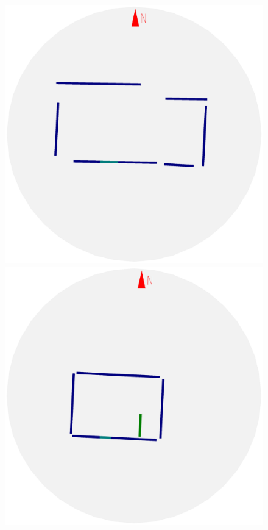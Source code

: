 \begin{figure}[t]
\begin{center}
\begin{minipage}[b]{0.72\textwidth}
  \includegraphics[width=\figwidth]{f2_8_2D_walls_rotate}\\ %
  \includegraphics[width=\figwidth]{f2_3_2D_walls_rotate} %

\end{minipage}
\end{center}
\end{figure}
